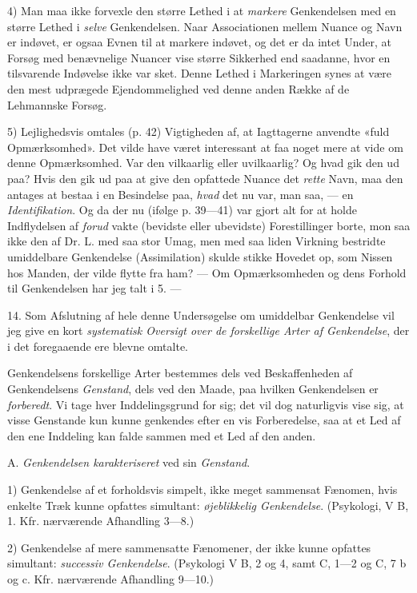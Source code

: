 \documentclass[12pt,a4paper,openany]{book}
\begin{document}
4) Man maa ikke forvexle den større Lethed i at \emph{markere} Genkendelsen med
en større Lethed i \emph{selve} Genkendelsen. Naar Associationen mellem Nuance
og Navn er indøvet, er ogsaa Evnen til at markere indøvet, og det er da intet
Under, at Forsøg med benævnelige Nuancer vise større Sikkerhed end saadanne,
hvor en tilsvarende Indøvelse ikke var sket. Denne Lethed i Markeringen synes
at være den mest udprægede Ejendommelighed ved denne anden Række af de
Lehmannske Forsøg.

5) Lejlighedsvis omtales (p. 42) Vigtigheden af, at Iagttagerne anvendte «fuld
Opmærksomhed». Det vilde have været interessant at faa noget mere at vide om
denne Opmærksomhed. Var den vilkaarlig eller uvilkaarlig? Og hvad gik den ud
paa? Hvis den gik ud paa at give den opfattede Nuance det \emph{rette} Navn,
maa den antages at bestaa i en Besindelse paa, \emph{hvad} det nu var, man saa,
--- en \emph{Identifikation}. Og da der nu (ifølge p. 39---41) var gjort alt
for at holde Indflydelsen af \emph{forud} vakte (bevidste eller ubevidste)
Forestillinger borte, mon saa ikke den af Dr. L. med saa stor Umag, men med saa
liden Virkning bestridte umiddelbare Genkendelse (Assimilation) skulde stikke
Hovedet op, som Nissen hos Manden, der vilde flytte fra ham? --- Om
Opmærksomheden og dens Forhold til Genkendelsen har jeg talt i 5. ---

14. Som Afslutning af hele denne Undersøgelse om umiddelbar Genkendelse vil jeg
give en kort \emph{systematisk Oversigt over de forskellige Arter af
Genkendelse}, der i det foregaaende ere blevne omtalte.

Genkendelsens forskellige Arter bestemmes dels ved Beskaffenheden af
Genkendelsens \emph{Genstand}, dels ved den Maade, paa hvilken Genkendelsen er
\emph{forberedt}. Vi tage hver Inddelingsgrund for sig; det vil dog naturligvis
vise sig, at visse Genstande kun kunne genkendes efter en vis Forberedelse, saa
at et Led af den ene Inddeling kan falde sammen med et Led af den anden.

A. \emph{Genkendelsen karakteriseret} ved sin \emph{Genstand}.

1) Genkendelse af et forholdsvis simpelt, ikke meget sammensat Fænomen, hvis
enkelte Træk kunne opfattes simultant: \emph{øjeblikkelig Genkendelse}.
(Psykologi, V B, 1. Kfr. nærværende Afhandling 3---8.)

2) Genkendelse af mere sammensatte Fænomener, der ikke kunne opfattes
simultant: \emph{successiv Genkendelse}. (Psykologi V B, 2 og 4, samt C, 1---2
og C, 7 b og c. Kfr. nærværende Afhandling 9---10.)
\end{document}
